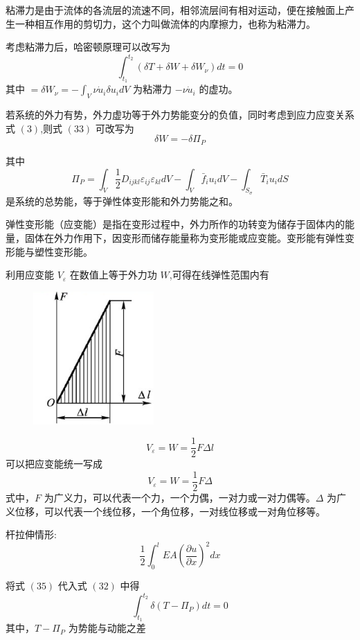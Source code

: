 \documentclass[12pt,a4paper]{article}
\begin{document}
粘滞力是由于流体的各流层的流速不同，相邻流层间有相对运动，便在接触面上产生一种相互作用的剪切力，这个力叫做流体的内摩擦力，也称为粘滞力。

考虑粘滞力后，哈密顿原理可以改写为
\begin{equation}
\int_{t_1}^{t_2} (\delta T+\delta W+\delta W_{\nu})dt=0
\end{equation}
其中 $=\delta W_{\nu}=-\int_{V}\nu\dot{u}_i\delta u_idV$ 为粘滞力 $-\nu\dot{u}_i$ 的虚功。

若系统的外力有势，外力虚功等于外力势能变分的负值，同时考虑到应力应变关系式 $(3)$,则式 $(33)$ 可改写为
\begin{equation}
\delta W=-\delta \Pi _P
\end{equation}

其中
\begin{equation}
\Pi _P=\int_{V}\frac{1}{2}D_{ijkl}\varepsilon_{ij}\varepsilon_{kl}dV-\int_{V}\bar{f}_iu_idV-\int_{S_{\sigma}}\bar{T}_iu_idS
\end{equation}
是系统的总势能，等于弹性体变形能和外力势能之和。

弹性变形能（应变能）是指在变形过程中，外力所作的功转变为储存于固体内的能量，固体在外力作用下，因变形而储存能量称为变形能或应变能。变形能有弹性变形能与塑性变形能。

利用应变能 $V_{\varepsilon}$ 在数值上等于外力功 $W$,可得在线弹性范围内有
\begin{figure}[H]
\centering
\includegraphics[scale=0.4]{./figures/4.png}
\caption{}
\end{figure}
$$
V_{\varepsilon}=W=\frac{1}{2}F\Delta l
$$
可以把应变能统一写成
$$
V_{\varepsilon}=W=\frac{1}{2}F\Delta
$$
式中，$F$ 为广义力，可以代表一个力，一个力偶，一对力或一对力偶等。$\Delta$ 为广义位移，可以代表一个线位移，一个角位移，一对线位移或一对角位移等。

杆拉伸情形:
$$
\frac{1}{2}\int_{0}^{l}EA(\frac{\partial u}{\partial x})^2 dx
$$

将式 $(35)$ 代入式 $(32)$ 中得
\begin{equation}
\int_{t_1}^{t_2}\delta(T-\Pi _P)dt=0
\end{equation}
其中，$T-\Pi _P$ 为势能与动能之差
\end{document}
